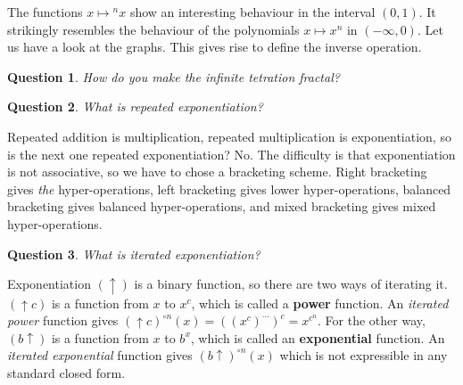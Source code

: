 \documentclass[12pt]{article}
\newtheorem{question}{Question}
\newtheorem{proposition}{Proposition}
\theoremstyle{definition}
\newcommand{\N}{\mathbb{N}}
\newcommand{\R}{\mathbb{R}}
\newcommand{\RP}{\mathbb{R}_+}
\newcommand{\RI}{\R_{>1}}
\newcommand{\tet}[2]{{{}^{#2}{#1}}}
\begin{document}
The functions $x\mapsto \tet{x}{n}$ show an interesting behaviour in
the interval $(0,1)$. It strikingly resembles the behaviour of the
polynomials $x\mapsto x^n$ in $(-\infty,0)$. Let us have a look at the
graphs.
This gives rise to define the inverse operation.



\begin{question}
How do you make the infinite tetration fractal?
\end{question}

\begin{question}
What is repeated exponentiation?
\end{question}
Repeated addition is multiplication, repeated multiplication is exponentiation, so is the next one repeated exponentiation? No.
The difficulty is that exponentiation is not associative,
so we have to chose a bracketing scheme. Right bracketing gives {\it the} hyper-operations, left bracketing gives lower hyper-operations, balanced bracketing gives balanced hyper-operations, and mixed bracketing gives mixed hyper-operations.

\begin{question}
What is iterated exponentiation?
\end{question}

Exponentiation $({\uparrow})$ is a binary function, so there are two ways of iterating it. $({\uparrow}c)$ is a function from $x$ to $x^c$, which is called a {\bf power} function. An {\it iterated power} function gives $({\uparrow}c)^{\circ n}(x) = ((x^c)^{\cdots})^c = x^{c^n}$. For the other way, $(b{\uparrow})$ is a function from $x$ to $b^x$, which is called an {\bf exponential} function. An {\it iterated exponential} function gives $(b{\uparrow})^{\circ n}(x)$ which is not expressible in any standard closed form.
\end{document}
